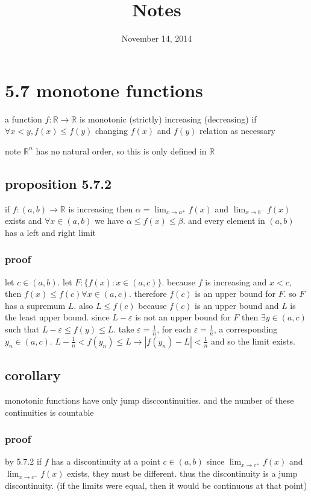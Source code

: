 \documentclass[letterpaper]{article}
\begin{document}
\title{Notes}
\date{November 14, 2014}
\maketitle
\section*{5.7 monotone functions}
a function $f:\mathbb{R}\to\mathbb{R}$ is monotonic (strictly) increasing (decreasing) if $\forall x<y, f(x)\le f(y)$ changing $f(x)$ and $f(y)$ relation as necessary

note $\mathbb{R}^n$ has no natural order, so this is only defined in $\mathbb{R}$ 

\subsection*{proposition 5.7.2}
if $f:(a,b)\to \mathbb{R}$ is increasing then $\alpha=\lim_{x\to a^+}f(x)$ and $\lim_{x\to b^-}f(x)$ exists and $\forall x\in (a,b)$ we have $\alpha\le f(x)\le \beta$. and every element in $(a,b)$ has a left and right limit
\subsubsection*{proof}
let $c\in(a,b)$. let $F:\{f(x):x\in(a,c)\}$. because $f$ is increasing and $x<c$, then $f(x)\le f(c)\forall x\in(a,c)$. therefore $f(c)$ is an upper bound  for $F$. so $F$ has a supremum $L$. also $L\le f(c)$ because $f(c)$ is an upper bound and $L$ is the least upper bound. since $L-\varepsilon$ is not an upper bound for $F$ then $\exists y\in(a,c)$ such that $L-\varepsilon\le f(y)\le L$. take $\varepsilon=\frac{1}{n}$, for each $\varepsilon=\frac{1}{n}$, a corresponding $y_n\in(a,c)$. $L-\frac{1}{n}<f(y_n)\le L\to |f(y_n)-L|<\frac{1}{n}$ and so the limit exists.
\subsection*{corollary}
monotonic functions have only jump disccontinuities. and the number of these continuities is countable
\subsubsection*{proof}
 by 5.7.2 if $f$ has a discontinuity at a point $c\in(a,b)$ since $\lim_{x\to c^+}f(x)$ and $\lim_{x\to c^-}f(x)$ exists, they must be different. thus the discontinuity is a jump discontinuity. (if the limits were equal, then it would be continuous at that point)
\end{document}

